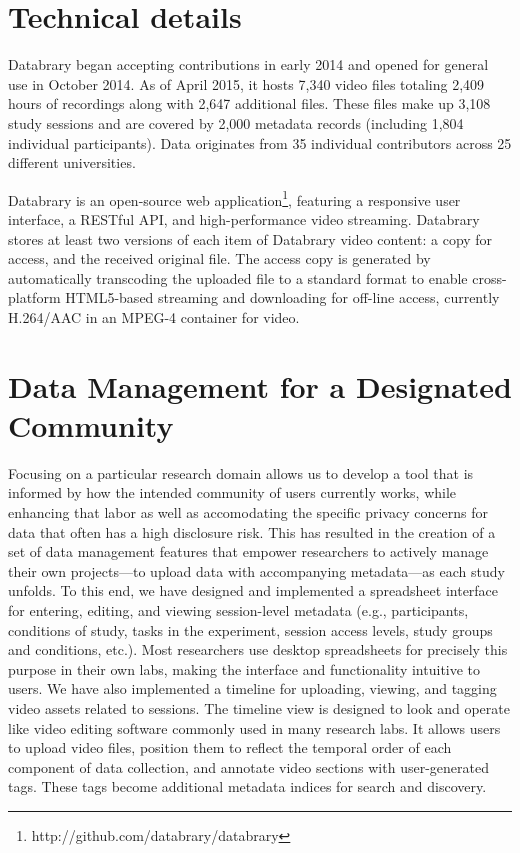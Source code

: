 \documentclass{sig-alternate}
\begin{document}
\section{Technical details}

Databrary began accepting contributions in early 2014 and opened for general use in October 2014.
As of April 2015, it hosts 7,340 video files totaling 2,409 hours of recordings along with 2,647 additional files.
These files make up 3,108 study sessions and are covered by 2,000 metadata records (including 1,804 individual participants).
Data originates from 35 individual contributors across 25 different universities.

Databrary is an open-source web application\footnote{http://github.com/databrary/databrary}, featuring a responsive user interface, a RESTful API, and high-performance video streaming.
Databrary stores at least two versions of each item of Databrary video content: a copy for access, and the received original file.
The access copy is generated by automatically transcoding the uploaded file to a standard format to enable cross-platform HTML5-based streaming and downloading for off-line access, currently H.264/AAC in an MPEG-4 container for video.

\section{Data Management for a Designated Community}

Focusing on a particular research domain allows us to develop a tool that is informed by how the intended community of users currently works, while enhancing that labor as well as accomodating the specific privacy concerns for data that often has a high disclosure risk.
This has resulted in the creation of a set of data management features that empower researchers to actively manage their own projects---to upload data with accompanying metadata---as each study unfolds. 
To this end, we have designed and implemented a spreadsheet interface for entering, editing, and viewing session-level metadata (e.g., participants, conditions of study, tasks in the experiment, session access levels, study groups and conditions, etc.). 
Most researchers use desktop spreadsheets for precisely this purpose in their own labs, making the interface and functionality intuitive to users. 
We have also implemented a timeline for uploading, viewing, and tagging video assets related to sessions.
The timeline view is designed to look and operate like video editing software commonly used in many research labs.
It allows users to upload video files, position them to reflect the temporal order of each component of data collection, and annotate video sections with user-generated tags. 
These tags become additional metadata indices for search and discovery.
\end{document}
